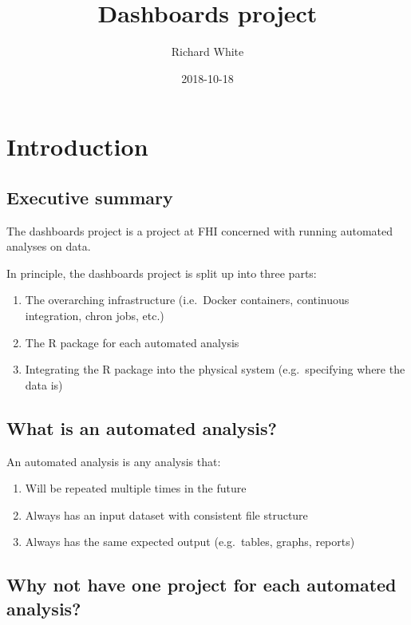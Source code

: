 \documentclass[12pt,]{article}
\title{Dashboards project}
\author{Richard White}
\date{2018-10-18}
\providecommand{\tightlist}{%
  \setlength{\itemsep}{0pt}\setlength{\parskip}{0pt}}
\begin{document}
\maketitle

{
\hypersetup{linkcolor=black}
\setcounter{tocdepth}{2}
\tableofcontents
}
\listoftables
\listoffigures
\section{Introduction}\label{introduction}

\subsection{Executive summary}\label{executive-summary}

The dashboards project is a project at FHI concerned with running
automated analyses on data.

In principle, the dashboards project is split up into three parts:

\begin{enumerate}
\def\labelenumi{\arabic{enumi}.}
\tightlist
\item
  The overarching infrastructure (i.e.~Docker containers, continuous
  integration, chron jobs, etc.)
\item
  The R package for each automated analysis
\item
  Integrating the R package into the physical system (e.g.~specifying
  where the data is)
\end{enumerate}

\subsection{What is an automated
analysis?}\label{what-is-an-automated-analysis}

An automated analysis is any analysis that:

\begin{enumerate}
\def\labelenumi{\arabic{enumi}.}
\tightlist
\item
  Will be repeated multiple times in the future
\item
  Always has an input dataset with consistent file structure
\item
  Always has the same expected output (e.g.~tables, graphs, reports)
\end{enumerate}

\subsection{Why not have one project for each automated
analysis?}\label{why-not-have-one-project-for-each-automated-analysis}
\end{document}
